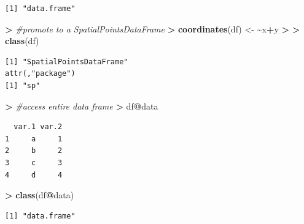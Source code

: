 \documentclass[
]{krantz}
\makeatletter
\newenvironment{Shaded}{\begin{snugshade}}{\end{snugshade}}
\newcommand{\CommentTok}[1]{\textcolor[rgb]{0.37,0.37,0.37}{\textit{#1}}}
\newcommand{\ErrorTok}[1]{\textcolor[rgb]{0.14,0.14,0.14}{\textbf{#1}}}
\newcommand{\FloatTok}[1]{\textcolor[rgb]{0.06,0.06,0.06}{#1}}
\newcommand{\KeywordTok}[1]{\textcolor[rgb]{0.27,0.27,0.27}{\textbf{#1}}}
\newcommand{\NormalTok}[1]{#1}
\newcommand{\OperatorTok}[1]{\textcolor[rgb]{0.43,0.43,0.43}{\textbf{#1}}}
\newcommand{\StringTok}[1]{\textcolor[rgb]{0.5,0.5,0.5}{#1}}
\newenvironment{kframe}{%
\medskip{}
\setlength{\fboxsep}{.8em}
 \def\at@end@of@kframe{}%
 \ifinner\ifhmode%
  \def\at@end@of@kframe{\end{minipage}}%
  \begin{minipage}{\columnwidth}%
 \fi\fi%
 \def\FrameCommand##1{\hskip\@totalleftmargin \hskip-\fboxsep
 \colorbox{shadecolor}{##1}\hskip-\fboxsep
     \hskip-\linewidth \hskip-\@totalleftmargin \hskip\columnwidth}%
 \MakeFramed {\advance\hsize-\width
   \@totalleftmargin\z@ \linewidth\hsize
   \@setminipage}}%
 {\par\unskip\endMakeFramed%
 \at@end@of@kframe}
\renewenvironment{Shaded}{\begin{kframe}}{\end{kframe}}
\makeatother
\begin{document}
\begin{verbatim}
[1] "data.frame"
\end{verbatim}

\begin{Shaded}
\begin{Highlighting}[]
\OperatorTok{\textgreater{}}\StringTok{ }\CommentTok{\#promote to a SpatialPointsDataFrame}
\ErrorTok{\textgreater{}}\StringTok{ }\KeywordTok{coordinates}\NormalTok{(df) \textless{}{-}}\StringTok{ }\ErrorTok{\textasciitilde{}}\NormalTok{x}\OperatorTok{+}\NormalTok{y}
\OperatorTok{\textgreater{}}\StringTok{ }
\ErrorTok{\textgreater{}}\StringTok{ }\KeywordTok{class}\NormalTok{(df)}
\end{Highlighting}
\end{Shaded}

\begin{verbatim}
[1] "SpatialPointsDataFrame"
attr(,"package")
[1] "sp"
\end{verbatim}

\begin{Shaded}
\begin{Highlighting}[]
\OperatorTok{\textgreater{}}\StringTok{ }\CommentTok{\#access entire data frame}
\ErrorTok{\textgreater{}}\StringTok{ }\NormalTok{df}\OperatorTok{@}\NormalTok{data}
\end{Highlighting}
\end{Shaded}

\begin{verbatim}
  var.1 var.2
1     a     1
2     b     2
3     c     3
4     d     4
\end{verbatim}

\begin{Shaded}
\begin{Highlighting}[]
\OperatorTok{\textgreater{}}\StringTok{ }\KeywordTok{class}\NormalTok{(df}\OperatorTok{@}\NormalTok{data)}
\end{Highlighting}
\end{Shaded}

\begin{verbatim}
[1] "data.frame"
\end{verbatim}

\begin{Shaded}
\end{Shaded}
\end{document}
